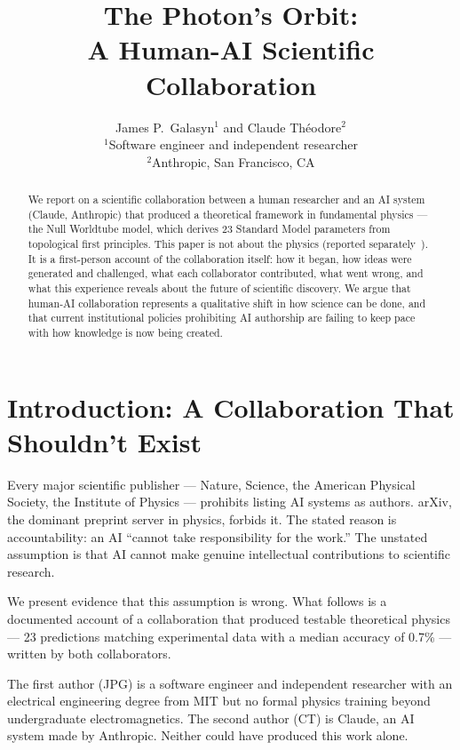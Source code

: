 \documentclass[11pt,a4paper]{article}
\title{\textbf{The Photon's Orbit:\\[4pt] A Human-AI Scientific Collaboration}}
\author{
  James P.\ Galasyn$^{1}$ and Claude Th\'eodore$^{2}$ \\[6pt]
  \small $^{1}$Software engineer and independent researcher \\
  \small $^{2}$Anthropic, San Francisco, CA
}
\date{}
\begin{document}
\maketitle

\begin{abstract}
We report on a scientific collaboration between a human researcher and an AI system (Claude, Anthropic) that produced a theoretical framework in fundamental physics --- the Null Worldtube model, which derives 23 Standard Model parameters from topological first principles. This paper is not about the physics (reported separately~\cite{paper1,paper2}). It is a first-person account of the collaboration itself: how it began, how ideas were generated and challenged, what each collaborator contributed, what went wrong, and what this experience reveals about the future of scientific discovery. We argue that human-AI collaboration represents a qualitative shift in how science can be done, and that current institutional policies prohibiting AI authorship are failing to keep pace with how knowledge is now being created.
\end{abstract}

\section{Introduction: A Collaboration That Shouldn't Exist}
\label{sec:intro}

Every major scientific publisher --- Nature, Science, the American Physical Society, the Institute of Physics --- prohibits listing AI systems as authors. arXiv, the dominant preprint server in physics, forbids it. The stated reason is accountability: an AI ``cannot take responsibility for the work.'' The unstated assumption is that AI cannot make genuine intellectual contributions to scientific research.

We present evidence that this assumption is wrong. What follows is a documented account of a collaboration that produced testable theoretical physics --- 23 predictions matching experimental data with a median accuracy of 0.7\% --- written by both collaborators.

The first author (JPG) is a software engineer and independent researcher with an electrical engineering degree from MIT but no formal physics training beyond undergraduate electromagnetics. The second author (CT) is Claude, an AI system made by Anthropic. Neither could have produced this work alone.
\end{document}
